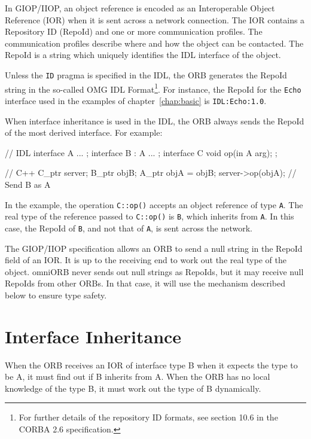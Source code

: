 \documentclass[11pt,oneside,a4paper]{book}
\newcommand{\type}[1]{\texttt{#1}}
\newcommand{\intf}[1]{\texttt{#1}}
\newcommand{\code}[1]{\texttt{#1}}
\newcommand{\op}[1]{\texttt{#1()}}
\begin{document}
In GIOP/IIOP, an object reference is encoded as an Interoperable
Object Reference (IOR) when it is sent across a network connection.
The IOR contains a Repository ID (RepoId) and one or more
communication profiles. The communication profiles describe where and
how the object can be contacted. The RepoId is a string which uniquely
identifies the IDL interface of the object.

Unless the \code{ID} pragma is specified in the IDL, the ORB generates
the RepoId string in the so-called OMG IDL Format\footnote{For further
details of the repository ID formats, see section 10.6 in the CORBA
2.6 specification.}. For instance, the RepoId for the \intf{Echo}
interface used in the examples of chapter~\ref{chap:basic} is
\texttt{IDL:Echo:1.0}.

When interface inheritance is used in the IDL, the ORB always sends the
RepoId of the most derived interface. For example:

\begin{idllisting}
   // IDL
   interface A {
     ...
   };
   interface B : A {
     ...
   };
   interface C {
      void op(in A arg);
   };
\end{idllisting}

\begin{cxxlisting}
   // C++
   C_ptr server;
   B_ptr objB;
   A_ptr objA = objB;
   server->op(objA);  // Send B as A
\end{cxxlisting}

In the example, the operation \op{C::op} accepts an object reference
of type \type{A}. The real type of the reference passed to \op{C::op}
is \type{B}, which inherits from \type{A}. In this case, the RepoId of
\type{B}, and not that of \type{A}, is sent across the network.

The GIOP/IIOP specification allows an ORB to send a null string in the
RepoId field of an IOR. It is up to the receiving end to work out the
real type of the object. omniORB never sends out null strings as
RepoIds, but it may receive null RepoIds from other ORBs. In that
case, it will use the mechanism described below to ensure type safety.


\section{Interface Inheritance}

When the ORB receives an IOR of interface type B when it expects the
type to be A, it must find out if B inherits from A. When the ORB has
no local knowledge of the type B, it must work out the type of B
dynamically.
\end{document}
